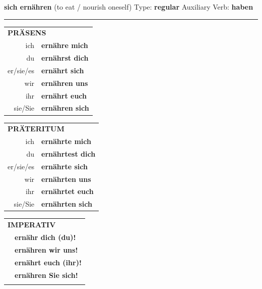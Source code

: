 \documentclass[10pt,a4paper]{revtex4-2}
\begin{document}
\begin{verbbox}
    {\Large \bf sich ernähren} (to eat / nourish oneself) \hfill Type: \textbf{regular} \hfill Auxiliary Verb: \textbf{haben} 
    
     \vspace{5pt}
    \hrule
    \vspace{5pt}

  \begin{tabular}{rl}
     \multicolumn{2}{l}{\textbf{PRÄSENS} }\\
    ich & \textbf{ernähre mich}\\
    du & \textbf{ernährst dich}\\
    er/sie/es & \textbf{ernährt sich}\\
    wir & \textbf{ernähren uns}\\
    ihr & \textbf{ernährt euch}\\
    sie/Sie & \textbf{ernähren sich}\\
  \end{tabular}
  \hfill
     \begin{tabular}{rl}
    \multicolumn{2}{l}{\textbf{PRÄTERITUM} }\\
    ich & \textbf{ernährte mich}\\
    du & \textbf{ernährtest dich}\\
    er/sie/es & \textbf{ernährte sich}\\
    wir & \textbf{ernährten uns}\\
    ihr & \textbf{ernährtet euch}\\
    sie/Sie & \textbf{ernährten sich}\\
  \end{tabular}
  \hfill
  \begin{tabular}{rl}
     \multicolumn{2}{l}{\textbf{IMPERATIV} }\\
   & \textbf{ernähr dich (du)!}\\
   & \textbf{ernähren wir uns!}\\
   & \textbf{ernährt euch (ihr)!}\\
   & \textbf{ernähren Sie sich!}\\
   & \vspace{10pt}
  \end{tabular}

 \vspace{10pt}


\end{verbbox}
\end{document}
